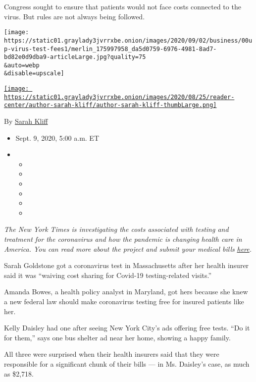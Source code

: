 Congress sought to ensure that patients would not face costs connected
to the virus. But rules are not always being followed.

\texttt{[image: https://static01.graylady3jvrrxbe.onion/images/2020/09/02/business/00up-virus-test-fees1/merlin\_175997958\_da5d0759-6976-4981-8ad7-bd82e0d9dba9-articleLarge.jpg?quality=75\\\&auto=webp\\\&disable=upscale]}

\href{https://www.nytimes3xbfgragh.onion/by/sarah-kliff}{\texttt{[image: https://static01.graylady3jvrrxbe.onion/images/2020/08/25/reader-center/author-sarah-kliff/author-sarah-kliff-thumbLarge.png]}}

By \href{https://www.nytimes3xbfgragh.onion/by/sarah-kliff}{Sarah Kliff}

\begin{itemize}
\item
  Sept. 9, 2020, 5:00 a.m. ET
\item
  \begin{itemize}
  \item
  \item
  \item
  \item
  \item
  \item
  \end{itemize}
\end{itemize}

\emph{The New York Times is investigating the costs associated with
testing and treatment for the coronavirus and how the pandemic is
changing health care in America. You can read more about the project and
submit your medical bills}
\href{http://www.nytimes3xbfgragh.onion/costofcare}{\emph{here}}\emph{.}

Sarah Goldstone got a coronavirus test in Massachusetts after her health
insurer said it was ``waiving cost sharing for Covid-19 testing-related
visits.''

Amanda Bowes, a health policy analyst in Maryland, got hers because she
knew a new federal law should make coronavirus testing free for insured
patients like her.

Kelly Daisley had one after seeing New York City's ads offering free
tests. ``Do it for them,'' says one bus shelter ad near her home,
showing a happy family.

All three were surprised when their health insurers said that they were
responsible for a significant chunk of their bills --- in Ms. Daisley's
case, as much as \$2,718.

